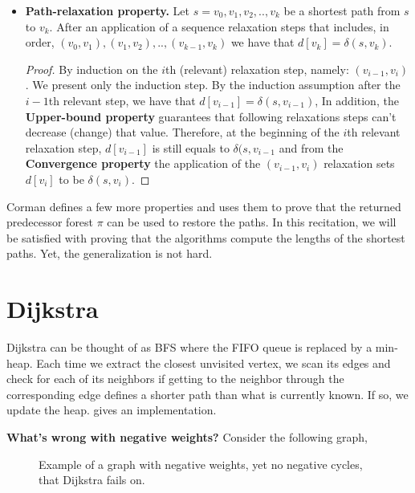 \begin{itemize}
        \item \textbf{Path-relaxation property.}
        Let $s = v_{0},v_{1},v_{2},..,v_{k}$ be a shortest path from $s$ to $v_{k}$. After an application of a sequence relaxation steps that includes, in order, $(v_{0},v_{1}),(v_{1},v_{2}),..,(v_{k-1},v_{k})$ we have that $d[v_{k}] = \delta(s,v_{k})$.
      \begin{proof}
        By induction on the $i$th (relevant) relaxation step, namely: $(v_{i-1},v_{i})$. We present only the induction step. By the induction assumption after the $i-1$th relevant step, we have that  $d[v_{i-1}] = \delta(s,v_{i-1})$, In addition, the \textbf{Upper-bound property} guarantees that following relaxations steps can't decrease (change) that value. Therefore, at the beginning of the $i$th relevant relaxation step, $d[v_{i-1}]$ is still equals to $\delta(s,v_{i-1}$ and from the \textbf{Convergence property} the application of the $(v_{i-1},v_{i})$ relaxation sets $d[v_{i}]$ to be $\delta(s,v_{i})$.


      \end{proof}
  \end{itemize}
  \begin{remark}
    Corman defines a few more properties and uses them to prove that the returned predecessor forest $\pi$ can be used to restore the paths. In this recitation, we will be satisfied with proving that the algorithms compute the lengths of the shortest paths. Yet, the generalization is not hard.
  \end{remark}

\section{Dijkstra}
Dijkstra can be thought of as BFS where the FIFO queue is replaced by a min-heap. Each time we extract the closest unvisited vertex, we scan its edges and check for each of its neighbors if getting to the neighbor through the corresponding edge defines a shorter path than what is currently known. If so, we update the heap.  gives an implementation.

\textbf{What's wrong with negative weights?} Consider the following graph, 


    \begin{figure}[h]
      \centering
      
      \caption{Example of a graph with negative weights, yet no negative cycles, that Dijkstra fails on. }
      \label{fig:negative}
    \end{figure}



